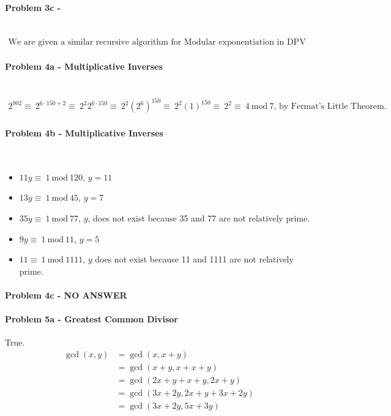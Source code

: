 \documentclass[fleqn]{article}
\begin{document}
\paragraph{Problem 3c -} ~\\
\begin{align*}
\text{We are given a similar recursive algorithm for Modular exponentiation in DPV 1.2.2. We are shown}
\end{align*}
\paragraph{Problem 4a - Multiplicative Inverses} ~\\
\begin{align*}
2^{902} \equiv\ 2^{6\cdot150 + 2} \equiv\ 2^{2}2^{6\cdot150} \equiv\ 2^{2}(2^{6})^{150} \equiv\ 2^{2}(1)^{150} \equiv\ 2^2 \equiv\ 4\ \textrm{mod}\ 7\text{, by Fermat's Little Theorem.}
\end{align*}

\paragraph{Problem 4b - Multiplicative Inverses} ~\\
\begin{itemize}
	\item $11y \equiv\ 1\ \textrm{mod}\ 120$, $y=11$
	\item $13y \equiv\ 1\ \textrm{mod}\ 45$, $y=7$
	\item $35y \equiv\ 1\ \textrm{mod}\ 77$, $y$, does not exist because 35 and 77 are not relatively prime.
	\item $9y \equiv\ 1\ \textrm{mod}\ 11$, $y=5$
	\item $11 \equiv\ 1\ \textrm{mod}\ 1111$, $y$ does not exist because 11 and 1111 are not relatively prime.
\end{itemize}

\paragraph{Problem 4c - NO ANSWER}

\paragraph{Problem 5a - Greatest Common Divisor}
True.
\begin{align*}
\gcd{(x,y)} &= \gcd{(x, x+y)}\\
&= \gcd{(x+y, x+x+y)}\\
&= \gcd{(2x+y+x+y, 2x+y)}\\
&= \gcd{(3x+2y,2x+y+3x+2y)}\\
&= \gcd{(3x+2y,5x+3y)}
\end{align*}
\end{document}
